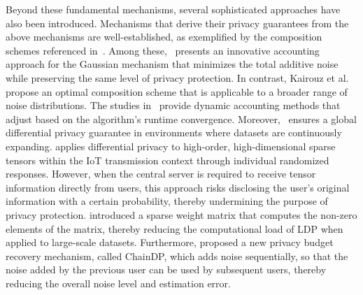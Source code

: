 Beyond these fundamental mechanisms, several sophisticated approaches have also been introduced.
Mechanisms that derive their privacy guarantees from the above mechanisms are well-established, as exemplified by the composition schemes referenced in~\cite{abadi2016deep,lee2018concentrated,lecuyer2019privacy,yu2019differentially,individual,qiu2023fast,10726610}. Among these,~\cite{abadi2016deep} presents an innovative accounting approach for the Gaussian mechanism that minimizes the total additive noise while preserving the same level of privacy protection. In contrast, Kairouz et al.~\cite{kairouz2014extremal} propose an optimal composition scheme that is applicable to a broader range of noise distributions. The studies in~\cite{lee2018concentrated,yu2019differentially} provide dynamic accounting methods that adjust based on the algorithm's runtime convergence. Moreover,~\cite{lecuyer2019privacy} ensures a global differential privacy guarantee in environments where datasets are continuously expanding.
\cite{individual} applies differential privacy to high-order, high-dimensional sparse tensors within the IoT transmission context through individual randomized responses. However, when the central server is required to receive tensor information directly from users, this approach risks disclosing the user's original information with a certain probability, thereby undermining the purpose of privacy protection.
\cite{qiu2023fast} introduced a sparse weight matrix that computes the non-zero elements of the matrix, thereby reducing the computational load of LDP when applied to large-scale datasets.
Furthermore, \cite{10726610} proposed a new privacy budget recovery mechanism, called ChainDP, which adds noise sequentially, so that the noise added by the previous user can be used by subsequent users, thereby reducing the overall noise level and estimation error.
